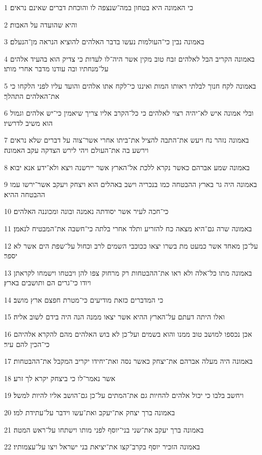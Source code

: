 \par 1 כי האמונה היא בטחון במה־שנצפה לו והוכחת דברים שאינם נראים׃
\par 2 והיא שהועדה על האבות׃
\par 3 באמונה נבין כי־העולמות נעשו בדבר האלהים להוציא הנראה מן־הנעלם׃
\par 4 באמונה הקריב הבל לאלהים זבח טוב מקין אשר היה־לו לעדות כי צדיק הוא בהעיד אלהים על־מנחתיו ובה עודנו מדבר אחרי מותו׃
\par 5 באמונה לקח חנוך לבלתי ראותו המות ואיננו כי־לקח אתו אלהים והועד עליו לפני הלקחו כי את־האלהים התהלך׃
\par 6 ובלי אמונה איש לא־יהיה רצוי לאלהים כי כל־הקרב אליו צריך שיאמין כי־יש אלהים וגמול הוא משיב לדרשיו׃
\par 7 באמונה נזהר נח ויעש את־התבה להציל את־ביתו אחרי אשר־צוה על דברים שלא נראים וירשע בה את־העולם ויהי לירש הצדקה עקב האמונה׃
\par 8 באמונה שמע אברהם כאשר נקרא ללכת אל־הארץ אשר יירשנה ויצא ולא־ידע אנא יבוא׃
\par 9 באמונה היה גר בארץ ההבטחה כמו בנכריה וישב באהלים הוא ויצחק ויעקב אשר־ירשו עמו ההבטחה ההיא׃
\par 10 כי־חכה לעיר אשר יסודתה נאמנה ובונה ומכוננה האלהים׃
\par 11 באמונה שרה גם־היא מצאה כח להזריע ותלד אחרי בלתה כי־חשבה את־המבטיח לנאמן׃
\par 12 על־כן מאחד אשר כמעט מת בשרו יצאו ככוכבי השמים לרב וכחול על־שפת הים אשר לא יספר׃
\par 13 באמונה מתו כל־אלה ולא ראו את־ההבטחות רק מרחוק צפו להן ויבטחו וישמחו לקראתן ויודו כי־גרים הם ותושבים בארץ׃
\par 14 כי המדברים כזאת מודיעים כי־מטרת חפצם ארץ מושב׃
\par 15 ואלו היתה דעתם על־הארץ ההיא אשר יצאו ממנה הנה היה בידם לשוב אליה׃
\par 16 אכן נכספו למושב טוב ממנו והוא בשמים ועל־כן לא בוש האלהים מהם להקרא אלהיהם כי־הכין להם עיר׃
\par 17 באמונה היה מעלה אברהם את־יצחק כאשר נסה ואת־יחידו יקריב המקבל את־ההבטחות׃
\par 18 אשר נאמר־לו כי ביצחק יקרא לך זרע׃
\par 19 ויחשב בלבו כי יכול אלהים להחיות גם את־המתים על־כן גם־הושב אליו להיות למשל׃
\par 20 באמונה ברך יצחק את־יעקב ואת־עשו וידבר על־עתידת למו׃
\par 21 באמונה ברך יעקב את־שני בני־יוסף לפני מותו וישתחו על־ראש המטה׃
\par 22 באמונה הזכיר יוסף בקרב־קצו את־יציאת בני ישראל ויצו על־עצמותיו׃
